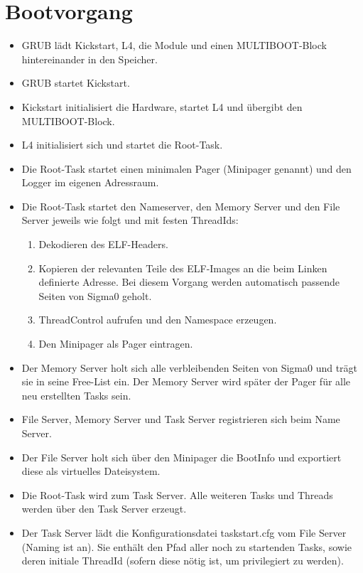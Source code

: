 \section{Bootvorgang}

\begin{itemize}
	\item GRUB lädt Kickstart, L4, die Module und einen MULTIBOOT-Block hintereinander in den Speicher.
	\item GRUB startet Kickstart.
	\item Kickstart initialisiert die Hardware, startet L4 und übergibt den MULTIBOOT-Block.
	\item L4 initialisiert sich und startet die Root-Task.
	\item Die Root-Task startet einen minimalen Pager (Minipager genannt) und den Logger im eigenen Adressraum.

	\item Die Root-Task startet den Nameserver, den Memory Server und den File Server jeweils wie folgt und mit festen ThreadIds:
	\begin{enumerate}
		\item Dekodieren des ELF-Headers.
		\item Kopieren der relevanten Teile des ELF-Images an die beim Linken definierte Adresse. Bei diesem Vorgang werden automatisch passende Seiten von Sigma0 geholt.
		\item ThreadControl aufrufen und den Namespace erzeugen.
		\item Den Minipager als Pager eintragen.
	\end{enumerate}
	
	\item Der Memory Server holt sich alle verbleibenden Seiten von Sigma0 und trägt sie in seine Free-List ein. Der Memory Server wird später der Pager für alle neu erstellten Tasks sein.
	
	\item File Server, Memory Server und Task Server registrieren sich beim Name Server.
	
	\item Der File Server holt sich über den Minipager die BootInfo und exportiert diese als virtuelles Dateisystem.
	
	\item Die Root-Task wird zum Task Server. Alle weiteren Tasks und Threads werden über den Task Server erzeugt.
	
	\item Der Task Server lädt die Konfigurationsdatei taskstart.cfg vom File Server (Naming ist an). Sie enthält den Pfad aller noch zu startenden Tasks, sowie deren initiale ThreadId (sofern diese nötig ist, um privilegiert zu werden).
	

\end{itemize}
